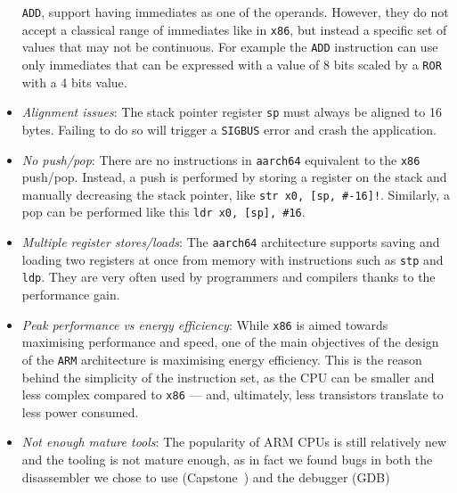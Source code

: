 \documentclass[a4paper,11pt,oneside]{report}
\newcommand{\todo}[1]{%
	\begingroup 
	\sethlcolor{cyan}%
	\hl{TODO: #1}%
	\endgroup
}
\begin{document}
\begin{itemize}
		\texttt{ADD}, support having immediates as one of the operands.  
		However, they do not accept a classical range of immediates like in 
		\texttt{x86}, but instead a specific set of values that may not be 
		continuous.  For example the \texttt{ADD} instruction can use only 
		immediates that can be expressed with a value of 8 bits scaled by a 
		\texttt{ROR} with a
		4 bits value.
	\item \emph{Alignment issues}: The stack pointer register \texttt{sp} must 
		always be aligned to 16 bytes. Failing to do so will trigger a 
		\texttt{SIGBUS} error and crash the application.
	\item \emph{No push/pop}: There are no instructions in \texttt{aarch64} 
		equivalent to the \texttt{x86} push/pop. Instead, a push is performed 
		by storing a register on the stack and manually decreasing the stack 
		pointer, like \verb|str x0, [sp, #-16]!|. Similarly, a pop can be 
		performed like this \verb|ldr x0, [sp], #16|.

	\item \emph{Multiple register stores/loads}: The \texttt{aarch64} 
		architecture supports saving and loading two registers at once from 
		memory with instructions such as \texttt{stp} and \texttt{ldp}. They 
		are very often used by programmers and compilers thanks to the 
		performance gain.

	\item \emph{Peak performance vs energy efficiency}: While \texttt{x86} is 
		aimed towards maximising performance and speed, one of the main 
		objectives of the design of the \texttt{ARM} architecture is maximising 
		energy efficiency. This is the reason behind the simplicity of the 
		instruction set, as the CPU can be smaller and less complex compared to 
		\texttt{x86} --- and, ultimately, less transistors translate to less 
		power consumed. 

	\item \emph{Not enough mature tools}: The popularity of ARM CPUs is still 
		relatively new and the tooling is not mature enough, as in fact we 
		found bugs in both the disassembler we chose to use 
		(Capstone~\cite{capstone}) and the debugger (GDB)
\end{itemize}




\end{document}
